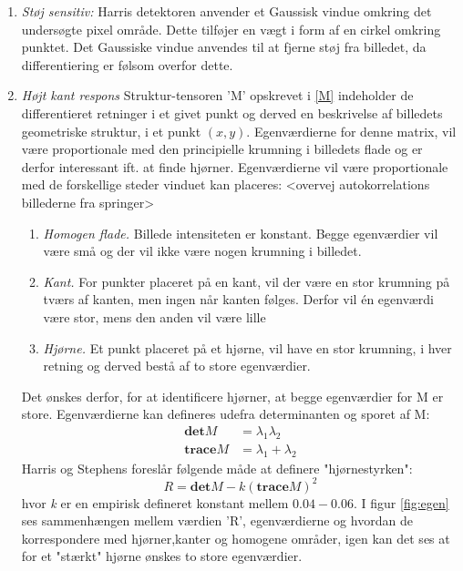 \begin{enumerate}
\item{\textit{Støj sensitiv:} Harris detektoren anvender et Gaussisk vindue omkring det undersøgte pixel område. Dette tilføjer en vægt i form af en cirkel omkring punktet. Det Gaussiske vindue anvendes til at fjerne støj fra billedet, da differentiering er følsom overfor dette.}
\item{\textit{Højt kant respons} Struktur-tensoren 'M' opskrevet i \eqref{M} indeholder de differentieret retninger i et givet punkt og derved en beskrivelse af billedets geometriske struktur, i et punkt $(x,y)$. Egenværdierne for denne matrix, vil være proportionale med den principielle krumning i billedets flade og er derfor interessant ift. at finde hjørner. Egenværdierne vil være proportionale med de forskellige steder vinduet kan placeres:
<overvej autokorrelations billederne fra springer>
\begin{enumerate}
\item{ \textit{Homogen flade.} Billede intensiteten er konstant. Begge egenværdier vil være små og der vil ikke være nogen krumning i billedet.}
\item{\textit{Kant.} For punkter placeret på en kant, vil der være en stor krumning på tværs af kanten, men ingen når kanten følges. Derfor vil én egenværdi være stor, mens den anden vil være lille}
\item{\textit{Hjørne.} Et punkt placeret på et hjørne, vil have en stor krumning, i hver retning og derved bestå af to store egenværdier.}
\end{enumerate}
Det ønskes derfor, for at identificere hjørner, at begge egenværdier for M er store. Egenværdierne kan defineres udefra determinanten og sporet af M:
\begin{subequations}
\begin{align}
\textbf{det}M & = \lambda_1 \lambda_2 \\
\textbf{trace}M & = \lambda_1+\lambda_2
\end{align}
\end{subequations}
Harris og Stephens foreslår følgende måde at definere "hjørnestyrken":
\begin{equation}
R = \textbf{det}M-k(\textbf{trace}M)^2
\end{equation}
hvor \textit{k} er en empirisk defineret konstant mellem $0.04-0.06$. I figur \ref{fig:egen} ses sammenhængen mellem værdien 'R', egenværdierne og hvordan de korrespondere med hjørner,kanter og homogene områder, igen kan det ses at for et "stærkt" hjørne ønskes to store egenværdier.

}
\end{enumerate}
